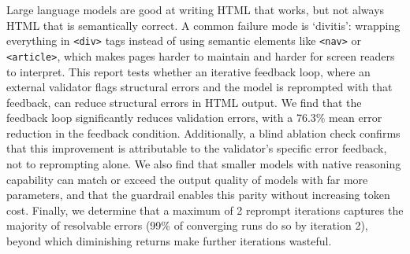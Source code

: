 
Large language models are good at writing HTML that works, but not always HTML that is semantically correct. A common failure mode is `divitis': wrapping everything in \verb|<div>| tags instead of using semantic elements like \verb|<nav>| or \verb|<article>|, which makes pages harder to maintain and harder for screen readers to interpret. This report tests whether an iterative feedback loop, where an external validator flags structural errors and the model is reprompted with that feedback, can reduce structural errors in HTML output. We find that the feedback loop significantly reduces validation errors, with a 76.3\% mean error reduction in the feedback condition. Additionally, a blind ablation check confirms that this improvement is attributable to the validator's specific error feedback, not to reprompting alone. We also find that smaller models with native reasoning capability can match or exceed the output quality of models with far more parameters, and that the guardrail enables this parity without increasing token cost. Finally, we determine that a maximum of 2 reprompt iterations captures the majority of resolvable errors (99\% of converging runs do so by iteration 2), beyond which diminishing returns make further iterations wasteful.